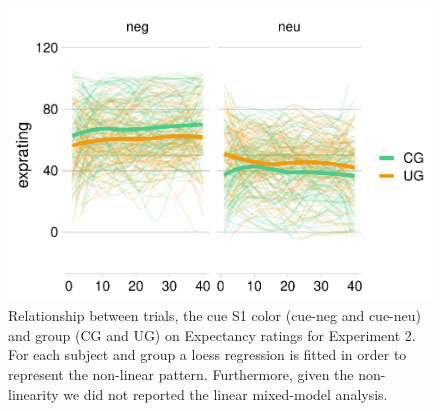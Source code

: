\documentclass[
]{article}
\begin{document}
\begin{figure}

{\centering \includegraphics[width=1950px]{supplementary_files/figure-latex/plot-auditory-trials-1} 

}

\caption{Relationship between trials, the cue S1 color (cue-neg and cue-neu) and group (CG and UG) on Expectancy ratings for Experiment 2. For each subject and group a loess regression is fitted in order to represent the non-linear pattern. Furthermore, given the non-linearity we did not reported the linear mixed-model analysis.}\label{fig:plot-auditory-trials}
\end{figure}
\end{document}
